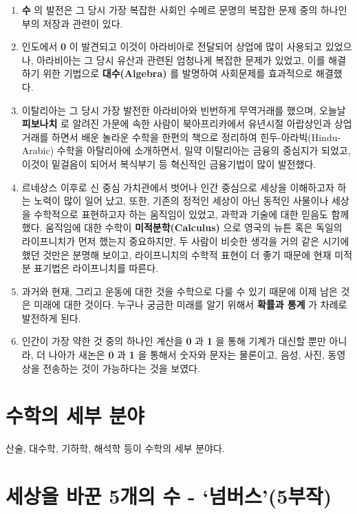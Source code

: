 \documentclass[
]{book}
\providecommand{\tightlist}{%
  \setlength{\itemsep}{0pt}\setlength{\parskip}{0pt}}
\begin{document}
\begin{enumerate}
\def\labelenumi{\arabic{enumi}.}
\tightlist
\item
  \textbf{수} 의 발전은 그 당시 가장 복잡한 사회인 수메르 문명의 복잡한 문제 중의 하나인 부의 저장과 관련이 있다.
\item
  인도에서 \textbf{0} 이 발견되고 이것이 아라비아로 전달되어 상업에 많이 사용되고 있었으나, 아라비아는 그 당시 유산과 관련된 엄청나게 복잡한 문제가 있었고, 이를 해결하기 위한 기법으로 \textbf{대수(Algebra)} 를 발명하여 사회문제를 효과적으로 해결했다.
\item
  이탈리아는 그 당시 가장 발전한 아라비아와 빈번하게 무역거래를 했으며, 오늘날 \textbf{피보나치} 로 알려진 가문에 속한 사람이 북아프리카에서 유년시절 아랍상인과 상업거래를 하면서 배운 놀라운 수학을 한편의 책으로 정리하여 힌두-아라빅(Hindu-Arabic) 수학을 아탈리아에 소개하면서, 일약 이탈리아는 금융의 중심지가 되었고, 이것이 밑걸음이 되어서 복식부기 등 혁신적인 금융기법이 많이 발전했다.
\item
  르네상스 이후로 신 중심 가치관에서 벗어나 인간 중심으로 세상을 이해하고자 하는 노력이 많이 일어 났고, 또한, 기존의 정적인 세상이 아닌 동적인 사물이나 세상을 수학적으로 표현하고자 하는 움직임이 있었고, 과학과 기술에 대한 믿음도 함께 했다. 움직임에 대한 수학이 \textbf{미적분학(Calculus)} 으로 영국의 뉴튼 혹은 독일의 라이프니치가 먼저 했는지 중요하지만, 두 사람이 비슷한 생각을 거의 같은 시기에 했던 것만은 분명해 보이고, 라이프니치의 수학적 표현이 더 좋기 때문에 현재 미적분 표기법은 라이프니치를 따른다.
\item
  과거와 현재, 그리고 운동에 대한 것을 수학으로 다룰 수 있기 때문에 이제 남은 것은 미래에 대한 것이다. 누구나 궁금한 미래를 알기 위해서 \textbf{확률과 통계} 가 차례로 발전하게 된다.
\item
  인간이 가장 약한 것 중의 하나인 계산을 \textbf{0} 과 \textbf{1} 을 통해 기계가 대신할 뿐만 아니라, 더 나아가 새논은 \textbf{0} 과 \textbf{1} 을 통해서 숫자와 문자는 물론이고, 음성, 사진, 동영상을 전송하는 것이 가능하다는 것을 보였다.
\end{enumerate}

\hypertarget{uxc218uxd559uxc758-uxc138uxbd80-uxbd84uxc57c}{%
\section{수학의 세부 분야}\label{uxc218uxd559uxc758-uxc138uxbd80-uxbd84uxc57c}}

산술, 대수학, 기하학, 해석학 등이 수학의 세부 분야다.

\hypertarget{uxc138uxc0c1uxc744-uxbc14uxafbc-5uxac1cuxc758-uxc218---uxb118uxbc84uxc2a45uxbd80uxc791}{%
\section{세상을 바꾼 5개의 수 - `넘버스'(5부작)}\label{uxc138uxc0c1uxc744-uxbc14uxafbc-5uxac1cuxc758-uxc218---uxb118uxbc84uxc2a45uxbd80uxc791}}
\end{document}
